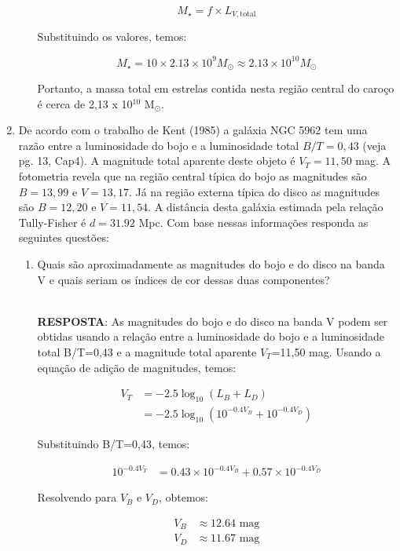 \documentclass[a4paper,12pt]{article}
\begin{document}
\begin{enumerate}
\begin{enumerate}
$$
M_\star = f \times L_{V,\text{total}}
$$

Substituindo os valores, temos:

$$
M_\star = 10 \times 2.13 \times 10^9 M_\odot \approx 2.13 \times 10^{10} M_\odot
$$

Portanto, a massa total em estrelas contida nesta região central do caroço é cerca de 2,13 x 10$^{10}$ M$_\odot$.

\noindent\hrulefill

\end{enumerate}

\item De acordo com o trabalho de Kent (1985) a galáxia NGC 5962 tem uma razão entre a luminosidade do bojo e a luminosidade total $B/T=0,43$ (veja pg. 13, Cap4). A magnitude total aparente deste objeto é $V_T=11,50$ mag. A fotometria revela que na região central típica do bojo as magnitudes são $B=13,99$ e $V =13,17$. Já na região externa típica do disco as magnitudes são $B=12,20$ e $V=11,54$. A distância desta galáxia estimada pela relação Tully-Fisher é $d=31.92$ Mpc. Com base nessas informações responda as seguintes questões:

\begin{enumerate}
\item Quais são aproximadamente as magnitudes do bojo e do disco na banda V e quais seriam os índices de cor dessas duas componentes?

\noindent\hrulefill\\\textbf{RESPOSTA}: As magnitudes do bojo e do disco na banda V podem ser obtidas usando a relação entre a luminosidade do bojo e a luminosidade total B/T=0,43 e a magnitude total aparente $V_T$=11,50 mag. Usando a equação de adição de magnitudes, temos:

\begin{align*}
V_T &= -2.5 \log_{10} (L_B + L_D)\\
&= -2.5 \log_{10} (10^{-0.4 V_B} + 10^{-0.4 V_D})
\end{align*}

Substituindo B/T=0,43, temos:

\begin{align*}
10^{-0.4 V_T} &= 0.43 \times 10^{-0.4 V_B} + 0.57 \times 10^{-0.4 V_D}
\end{align*}

Resolvendo para $V_B$ e $V_D$, obtemos:

\begin{align*}
V_B &\approx 12.64 \text{ mag}\\
V_D &\approx 11.67 \text{ mag}
\end{align*}


\end{enumerate}
\end{enumerate}
\end{document}
